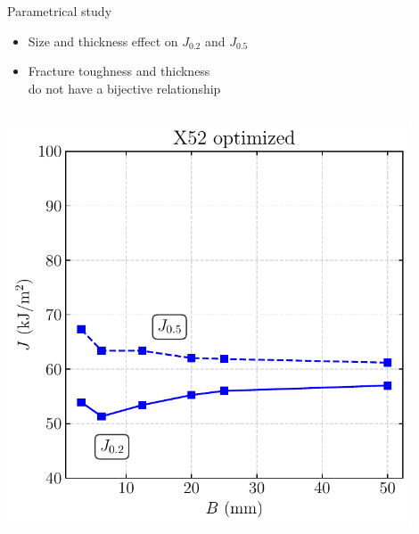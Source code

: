 \documentclass[9pt]{beamer}
\begin{document}
\begin{frame}{Parametrical study}

	\vspace{0.25cm}

    \begin{itemize}
        \item Size and thickness effect on $J_{0.2}$ and $J_{0.5}$
        \vspace{0.15cm}
        \item Fracture toughness and thickness\\ do not have a bijective relationship
    \end{itemize}

    \vspace{0.15cm}

    \begin{columns}
        \centering
        \includegraphics[width=0.9\textwidth]{Images/plot_geoJ_homo_1_2__1_4.pdf}
        

\end{columns}
\end{frame}
\end{document}

